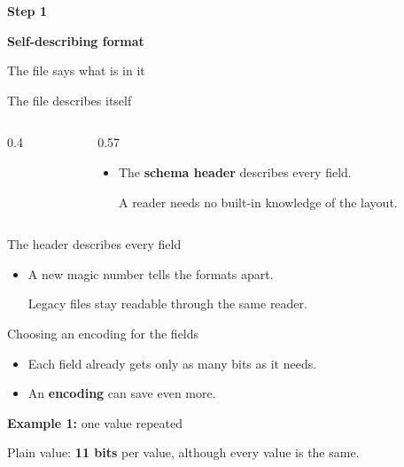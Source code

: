 \documentclass[aspectratio=169,11pt]{beamer}
\newcommand{\vals}[1]{\foreach \v [count=\k] in {#1} \node[draw=black!65,fill=blue!8,minimum height=6mm,minimum width=14mm,font=\small,inner sep=2pt] at (\k*1.5,0) {\v};}
\newcommand{\thento}[1]{\par\vspace{1mm}\noindent\makebox[1.4em][l]{\color{gold!85!black}$\Rightarrow$}\parbox[t]{\dimexpr\linewidth-1.4em}{\raggedright #1}\par}
\newcommand{\stepframe}[3]{%
\begin{frame}
\vfill
{\centering
{\usebeamercolor[fg]{title}\large\bfseries Step #1\par}
\vspace{1mm}
{\usebeamercolor[fg]{title}\huge\bfseries #2\par}
\vspace{3mm}
{\color{black!60}#3\par}
\vspace{9mm}
\def\activestep{#1}%
\resizebox{0.85\linewidth}{!}{}\par}
\vfill
\end{frame}}
\begin{document}

\stepframe{1}{Self-describing format}{The file says what is in it}

\begin{frame}{The file describes itself}
\begin{columns}[c]
\begin{column}{0.4\textwidth}
\centering\resizebox{\linewidth}{!}{}
\end{column}
\begin{column}{0.57\textwidth}
\begin{itemize}
\item The \textbf{schema header} describes every field.
\thento{A reader needs no built-in knowledge of the layout.}
\end{itemize}
\end{column}
\end{columns}
\end{frame}

\begin{frame}{The header describes every field}
\centering\vfill
\resizebox{\linewidth}{!}{}
\vfill
\par\raggedright
\begin{itemize}
\item A new magic number tells the formats apart.
\thento{Legacy files stay readable through the same reader.}
\end{itemize}
\vfill
\end{frame}

\begin{frame}{Choosing an encoding for the fields}
\begin{itemize}
\item Each field already gets only as many bits as it needs.
\item An \textbf{encoding} can save even more.
\end{itemize}
\vspace{4mm}
\textbf{Example 1:} one value repeated
\vspace{2mm}

\vspace{1mm}
\thento{Plain value: \textbf{11 bits} per value, although every value is the same.}
\end{frame}
\end{document}
